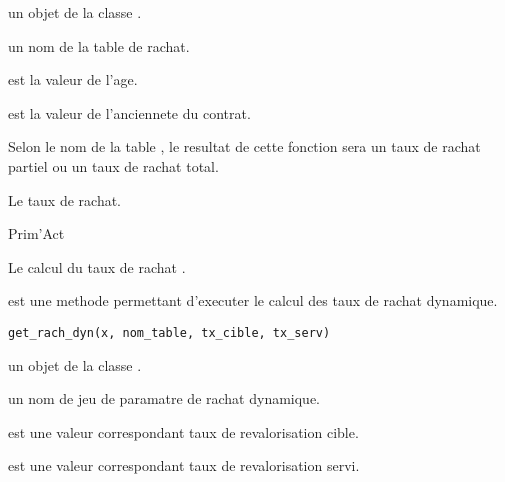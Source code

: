 \documentclass[a4paper]{book}
\begin{document}
%
\begin{Arguments}
\begin{ldescription}
\item[\code{x}] un objet de la classe .

\item[\code{nom\_table}] un nom de la table de rachat.

\item[\code{age}] est la valeur  de l'age.

\item[\code{anc}] est la valeur  de l'anciennete du contrat.
\end{ldescription}
\end{Arguments}
%
\begin{Details}\relax
Selon le nom de la table , le resultat de cette fonction sera un taux
de rachat partiel ou un taux de rachat total.
\end{Details}
%
\begin{Value}
Le taux de rachat.
\end{Value}
%
\begin{Author}\relax
Prim'Act
\end{Author}
%
\begin{SeeAlso}\relax
Le calcul du taux de rachat .
\end{SeeAlso}
%
\begin{Description}\relax
{} est une methode permettant d'executer le calcul des taux de rachat dynamique.
\end{Description}
%
\begin{Usage}
\begin{verbatim}
get_rach_dyn(x, nom_table, tx_cible, tx_serv)
\end{verbatim}
\end{Usage}
%
\begin{Arguments}
\begin{ldescription}
\item[\code{x}] un objet de la classe .

\item[\code{nom\_table}] un nom de jeu de paramatre de rachat dynamique.

\item[\code{tx\_cible}] est une valeur  correspondant taux de revalorisation cible.

\item[\code{tx\_serv}] est une valeur  correspondant taux de revalorisation servi.
\end{ldescription}
\end{Arguments}
\end{document}
